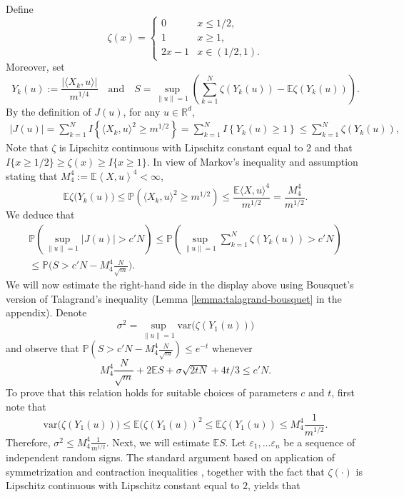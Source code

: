 \documentclass[12pt]{article}
\newcommand\var{\mathrm{var}}
\newcommand{\mb}{\mathbb}
\newcommand{\dotp}[2]{\left\langle#1,#2\right\rangle}
\theoremstyle{thmstyletwo}%
\theoremstyle{thmstylethree}%
\begin{document}
Define 
\[
    \zeta(x) = \begin{cases}
        0 & x\leq 1/2,\\
        1 & x\geq 1, \\
        2x - 1 & x\in (1/2, 1).
    \end{cases}
\]
Moreover, set
\[
    Y_k(u) := \frac{|\langle X_k, u\rangle|}{m^{1/4}}\quad\text{and}\quad S=\sup_{\|u\| = 1}\left(\sum_{k=1}^N \zeta(Y_k(u)) - \mb{E} \zeta(Y_k(u))\right). 
\]
By the definition of $J(u)$, for any $u\in \mb{R}^d$,
\begin{multline*}
        |J(u)|  = \sum_{k=1}^N I\left\{\langle X_k, u\rangle^2 \geq m^{1/2}\right\} 
        = \sum_{k=1}^N I\left\{Y_k(u) \geq 1\right\} \leq \sum_{k=1}^N \zeta\left(Y_k(u)\right),
\end{multline*}
Note that $\zeta$ is Lipschitz continuous with Lipschitz constant equal to $2$ and that $I\{x\geq 1/2\}\geq \zeta(x) \geq I\{x\geq 1\}$. In view of Markov's inequality and assumption stating that $M_4^4:=\mb E \dotp{X}{u}^4<\infty$,
\begin{equation}
\label{rhoexpectation}
    \mb{E} \zeta\big(Y_k(u)\big) \leq \mb{P}\left(\langle X_k, u\rangle^2 \geq m^{1/2}\right)\leq \frac{\mb{E}\langle X,u\rangle^4}{m^{1/2}} = \frac{M_4^4}{m^{1/2}}.
\end{equation}
We deduce that 
\begin{multline*}
    \mb{P}\left( \sup_{\|u\| = 1}|J(u)| > c'N\right)
    \leq \mb{P} \left(\sup_{\|u\|=1}\sum_{k=1}^N \zeta(Y_k(u))>c'N\right)
    \\
    \leq \mb{P} \Bigg(S>c'N - M_4^4 \frac{N}{\sqrt m}\Bigg).
\end{multline*}
We will now estimate the right-hand side in the display above using Bousquet's version of Talagrand's inequality (Lemma \ref{lemma:talagrand-bousquet} in the appendix). Denote 
\[
\sigma^2 = \sup_{\|u\| = 1}\var\big(\zeta(Y_1(u))\big)
\]
and observe that $\mb{P} \left(S>c'N - M_4^4 \frac{N}{\sqrt m}\right)\leq e^{-t}$ whenever
\[
     M_4^4 \frac{N}{\sqrt m} + 2\mb{E}S + \sigma\sqrt{2tN} +  4t/3 \leq c'N.
\]
To prove that this relation holds for suitable choices of parameters $c$ and $t$, first note that 
\begin{equation*}
    \var\big(\zeta(Y_1(u))\big) \leq \mb{E}(\zeta(Y_1(u))^2\leq \mb{E}\zeta(Y_1(u)) \leq M_4^4 \frac{1}{m^{1/2}}.
\end{equation*}
Therefore, 
\(
\sigma^2 \leq M_4^4 \frac{1}{m^{1/2}}.
\)
Next, we will estimate $\mb{E}S$. 
Let $\varepsilon_1,\dots \varepsilon_n$ be a sequence of independent random signs. The standard argument based on application of symmetrization and contraction inequalities \citep[Theorem 4.4]{ledoux2013probability}, together with the fact that $\zeta(\cdot)$ is Lipschitz continuous with Lipschitz constant equal to $2$, yields that 
\end{document}
